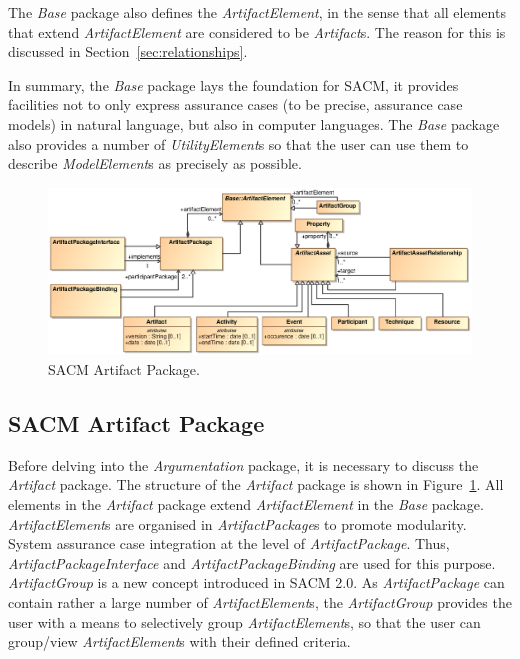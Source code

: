 The \textit{Base} package also defines the \textit{ArtifactElement}, in the sense that all elements that extend \textit{ArtifactElement} are considered to be \textit{Artifact}s. 
The reason for this is discussed in Section~\ref{sec:relationships}. 

In summary, the \textit{Base} package lays the foundation for SACM, it provides facilities not to only express assurance cases (to be precise, assurance case models) in natural language, but also in computer languages. 
The \textit{Base} package also provides a number of \textit{UtilityElement}s so that the user can use them to describe \textit{ModelElement}s as precisely as possible.

\begin{figure}
	\centering
	\includegraphics[width=1\linewidth]{Artifact.eps}
	\caption{SACM Artifact Package.}
	\label{fig:arti}
\end{figure}

\subsection{SACM Artifact Package}
\label{sec:artiPack}
Before delving into the \textit{Argumentation} package, it is necessary to discuss the \textit{Artifact} package. The structure of the \textit{Artifact} package is shown in Figure~\ref{fig:arti}. 
All elements in the \textit{Artifact} package extend \textit{ArtifactElement} in the \textit{Base} package. \textit{ArtifactElement}s are organised in \textit{ArtifactPackage}s to promote modularity. 
System assurance case integration at the level of \textit{ArtifactPackage}. 
Thus, \textit{ArtifactPackageInterface} and \textit{ArtifactPackageBinding} are used for this purpose.
\textit{ArtifactGroup} is a new concept introduced in SACM 2.0. 
As \textit{ArtifactPackage} can contain rather a large number of \textit{ArtifactElement}s, the \textit{ArtifactGroup} provides the user with a means to selectively group \textit{ArtifactElement}s, so that the user can group/view \textit{ArtifactElement}s with their defined criteria.

